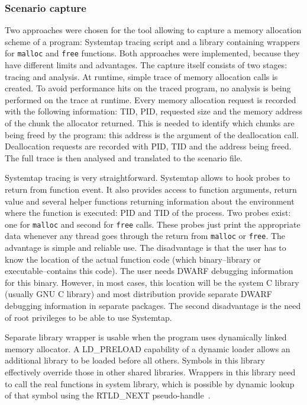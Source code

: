 \subsubsection{Scenario capture}
Two approaches were chosen for the tool allowing to capture a memory allocation
scheme of a program: Systemtap tracing script\cite{systemtap} and a library
containing wrappers for {\tt malloc} and {\tt free} functions. Both approaches
were implemented, because they have different limits and advantages. The capture
itself consists of two stages: tracing and analysis. At runtime, simple trace of
memory allocation calls is created. To avoid performance hits on the traced
program, no analysis is being performed on the trace at runtime. Every memory
allocation request is recorded with the following information: TID, PID,
requested size and the memory address of the chunk the allocator returned. This
is needed to identify which chunks are being freed by the program: this address
is the argument of the deallocation call. Deallocation requests are recorded with
PID, TID and the address being freed. The full trace is then analysed and
translated to the scenario file.

Systemtap tracing is very straightforward. Systemtap allows to hook probes to
return from function event. It also provides access to function arguments, return
value and several helper functions returning information about the environment
where the function is executed: PID and TID of the process. Two probes exist: one
for {\tt malloc} and second for {\tt free} calls. These probes just print the
appropriate data whenever any thread goes through the return from {\tt malloc} or
{\tt free}. The advantage is simple and reliable use. The disadvantage is that
the user has to know the location of the actual function code (which
binary--library or executable--contains this code). The user needs DWARF
debugging information for this binary. However, in most cases, this location will
be the system C library (usually GNU C library) and most distribution provide
separate DWARF debugging information in separate packages. The second
disadvantage is the need of root privileges to be able to use Systemtap.

Separate library wrapper is usable when the program uses dynamically linked
memory allocator. A LD\_PRELOAD capability of a dynamic loader allows an
additional library to be loaded before all others. Symbols in this library
effectively override those in other shared libraries. Wrappers in this library
need to call the real functions in system library, which is possible by dynamic
lookup of that symbol using the RTLD\_NEXT pseudo-handle~\cite{RTLD_NEXT}.

